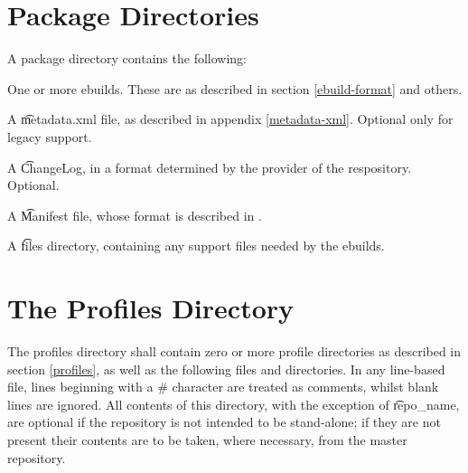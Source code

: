 
\section{Package Directories}
\label{package-dirs}

A package directory contains the following:
\begin{bulletlist}
\item One or more ebuilds. These are as described in section \ref{ebuild-format} and others.
\item A \t{metadata.xml} file, as described in appendix \ref{metadata-xml}. Optional only for
    legacy support.
\item A \t{ChangeLog}, in a format determined by the provider of the respository. Optional.
\item A \t{Manifest} file, whose format is described in \cite{Glep44}.
\item A \t{files} directory, containing any support files needed by the ebuilds.
\end{bulletlist}


\section{The Profiles Directory}
\label{profiles-dir}

The profiles directory shall contain zero or more profile directories as described in section
\ref{profiles}, as well as the following files and directories. In any line-based file, lines
beginning with a \# character are treated as comments, whilst blank lines are ignored. All contents
of this directory, with the exception of \t{repo\_name}, are optional if the repository is not
intended to be stand-alone; if they are not present their contents are to be taken, where necessary,
from the master repository.

